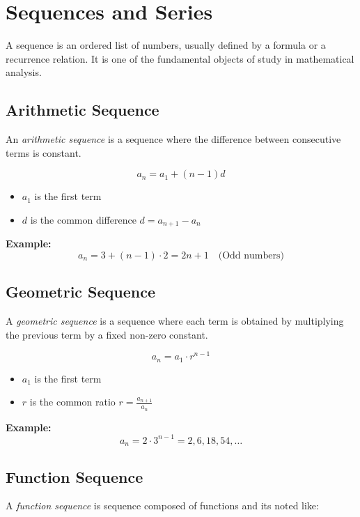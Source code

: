 \newpage
\section{Sequences and Series}

A sequence is an ordered list of numbers, usually defined by a formula or a recurrence relation. It is one of the fundamental objects of study in mathematical analysis.

\subsection{Arithmetic Sequence}

An \emph{arithmetic sequence} is a sequence where the difference between consecutive terms is constant.

\[
a_n = a_1 + (n - 1)d
\]

\begin{itemize}[label=\(-\)]
\item \(a_1\) is the first term
\item \(d\) is the common difference \(d = a_{n + 1} - a_{n}\)
\end{itemize}

\textbf{Example:}
\[
a_n = 3 + (n - 1) \cdot 2 = 2n + 1 \quad \text{(Odd numbers)}
\]

\subsection{Geometric Sequence}

A \emph{geometric sequence} is a sequence where each term is obtained by multiplying the previous term by a fixed non-zero constant.

\[
a_n = a_1 \cdot r^{n-1}
\]

\begin{itemize}[label=\(-\)]
\item \(a_1\) is the first term
\item \(r\) is the common ratio \(r = \frac{a_{n + 1}}{a_n}\)
\end{itemize}

\textbf{Example:}
\[
a_n = 2 \cdot 3^{n-1} = 2, 6, 18, 54, \dots
\]

\subsection{Function Sequence}

A \emph{function sequence} is sequence composed of functions and its noted like:

